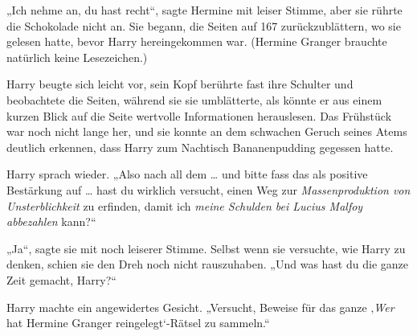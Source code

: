 
„Ich nehme an, du hast recht“, sagte Hermine mit leiser Stimme, aber sie rührte die Schokolade nicht an. Sie begann, die Seiten auf 167 zurückzublättern, wo sie gelesen hatte, bevor Harry hereingekommen war. (Hermine Granger brauchte natürlich keine Lesezeichen.)

Harry beugte sich leicht vor, sein Kopf berührte fast ihre Schulter und beobachtete die Seiten, während sie sie umblätterte, als könnte er aus einem kurzen Blick auf die Seite wertvolle Informationen herauslesen. Das Frühstück war noch nicht lange her, und sie konnte an dem schwachen Geruch seines Atems deutlich erkennen, dass Harry zum Nachtisch Bananenpudding gegessen hatte.

Harry sprach wieder.
„Also nach all dem … und bitte fass das als positive Bestärkung auf … hast du wirklich versucht, einen Weg zur \emph{Massenproduktion von Unsterblichkeit} zu erfinden, damit ich \emph{meine Schulden bei Lucius Malfoy abbezahlen} kann?“

„Ja“, sagte sie mit noch leiserer Stimme. Selbst wenn sie versuchte, wie Harry zu denken, schien sie den Dreh noch nicht rauszuhaben.
„Und was hast du die ganze Zeit gemacht, Harry?“

Harry machte ein angewidertes Gesicht.
„Versucht, Beweise für das ganze ‚\emph{Wer} hat Hermine Granger reingelegt‘-Rätsel zu sammeln.“

